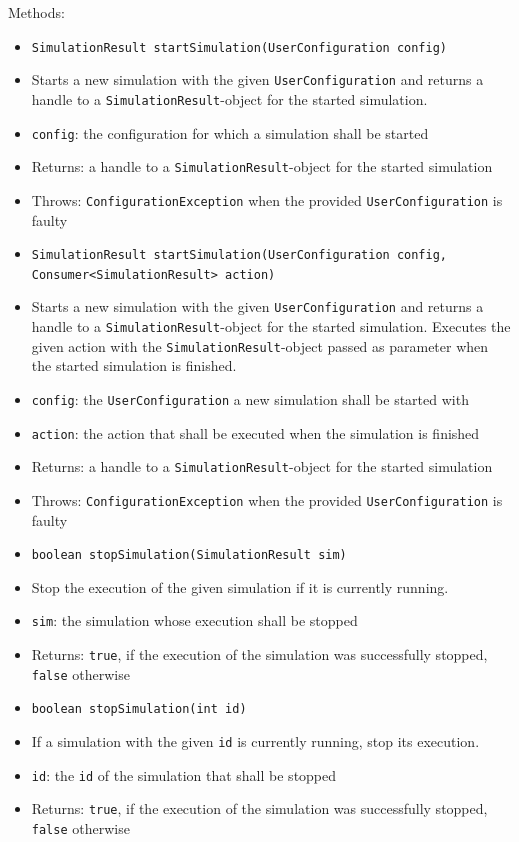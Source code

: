 \documentclass[parskip=full,11pt]{scrartcl}
\begin{document}
Methods:
\begin{itemize} \itemsep -10pt
	\item \texttt{SimulationResult startSimulation(UserConfiguration config)}
	\item[] Starts a new simulation with the given \texttt{UserConfiguration} and returns a handle to a \texttt{SimulationResult}-object for the started simulation.
	\item[]\texttt{config}: the configuration for which a simulation shall be started
	\item[] Returns: a handle to a \texttt{SimulationResult}-object for the started simulation
	\item[] Throws: \texttt{ConfigurationException} when the provided \texttt{UserConfiguration} is faulty
	
	\item \texttt{SimulationResult startSimulation(UserConfiguration config, Consumer<SimulationResult> action)}
	\item[] Starts a new simulation with the given \texttt{UserConfiguration} and returns a handle to a \texttt{SimulationResult}-object for the started simulation. Executes the given action with the \texttt{SimulationResult}-object passed as parameter when the started simulation is finished.
	\item[] \texttt{config}: the \texttt{UserConfiguration} a new simulation shall be started with
	\item[] \texttt{action}: the action that shall be executed when the simulation is finished
	\item[] Returns: a handle to a \texttt{SimulationResult}-object for the started simulation
	\item[] Throws: \texttt{ConfigurationException} when the provided \texttt{UserConfiguration} is faulty
	
	\item \texttt{boolean stopSimulation(SimulationResult sim)}
	\item[] Stop the execution of the given simulation if it is currently running.
	\item[] \texttt{sim}: the simulation whose execution shall be stopped
	\item[] Returns: \texttt{true}, if the execution of the simulation was successfully stopped, \texttt{false} otherwise
	
	\item \texttt{boolean stopSimulation(int id)}
	\item[] If a simulation with the given \texttt{id} is currently running, stop its execution.
	\item[] \texttt{id}: the \texttt{id} of the simulation that shall be stopped
	\item[] Returns: \texttt{true}, if the execution of the simulation was successfully stopped, \texttt{false} otherwise
	

\end{itemize}
\end{document}
